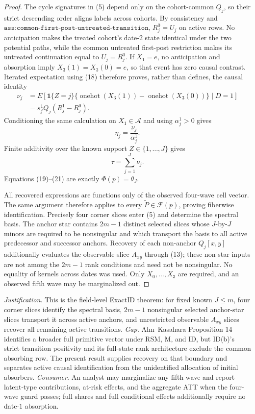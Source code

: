 \documentclass{article}
\begin{document}
\begin{proof}
The cycle signatures in (5) depend only on the cohort-common \(Q_j\), so their strict descending order aligns labels across cohorts.  By consistency and \(\texttt{ass:common-first-post-untreated-transition}\), \(R_j^0=U_j\) on active rows.  No anticipation makes the treated cohort's date-\(2\) state identical under the two potential paths, while the common untreated first-post restriction makes its untreated continuation equal to \(U_j=R_j^0\).  If \(X_1=e\), no anticipation and absorption imply \(X_3(1)=X_3(0)=e\), so that event has zero causal contrast.  Iterated expectation using (18) therefore proves, rather than defines, the causal identity
\[
\begin{aligned}
 \nu_j
 &=E\!\left[\mathbf1\{Z=j\}
 \{\operatorname{onehot}(X_3(1))-\operatorname{onehot}(X_3(0))\}
 \mid D=1\right]\\
 &=s_j^1Q_j(R_j^1-R_j^0).
\end{aligned}
\tag{19}
\]
Conditioning the same calculation on \(X_1\in\mathcal A\) and using \(\alpha_j^1>0\) gives
\[
 \eta_j=\frac{\nu_j}{\alpha_j^1}.
\tag{20}
\]
Finite additivity over the known support \(Z\in\{1,\ldots,J\}\) gives
\[
 \tau=\sum_{j=1}^J\nu_j.
\tag{21}
\]
Equations (19)--(21) are exactly \(\Phi(p)=\theta_J\).

All recovered expressions are functions only of the observed four-wave cell vector.  The same argument therefore applies to every \(\widetilde P\in\mathcal F(p)\), proving fiberwise identification.  Precisely four corner slices enter (5) and determine the spectral basis.  The anchor star contains \(2m-1\) distinct selected slices whose \(J\)-by-\(J\) minors are required to be nonsingular and which transport the basis to all active predecessor and successor anchors.  Recovery of each non-anchor \(Q_j[x,y]\) additionally evaluates the observable slice \(A_{xy}\) through (13); these non-star inputs are not among the \(2m-1\) rank conditions and need not be nonsingular.  No equality of kernels across dates was used.  Only \(X_0,\ldots,X_3\) are required, and an observed fifth wave may be marginalized out.
\end{proof}
\par\smallskip\noindent \textit{Justification.} This is the field-level ExactID theorem: for fixed known \(J\leq m\), four corner slices identify the spectral basis, \(2m-1\) nonsingular selected anchor-star slices transport it across active anchors, and unrestricted observable \(A_{xy}\) slices recover all remaining active transitions. \textit{Gap.} Ahn--Kasahara Proposition 14 identifies a broader full primitive vector under RSM, M, and ID, but ID(b)'s strict transition positivity and its full-state rank architecture exclude the common absorbing row.  The present result supplies recovery on that boundary and separates active causal identification from the unidentified allocation of initial absorbers. \textit{Consumer.} An analyst may marginalize any fifth wave and report latent-type contributions, at-risk effects, and the aggregate ATT when the four-wave guard passes; full shares and full conditional effects additionally require no date-\(1\) absorption.
\end{document}
